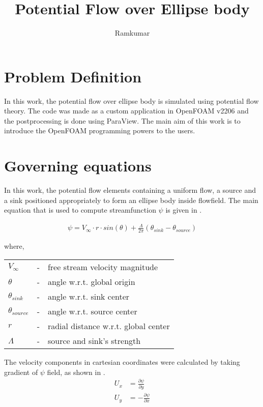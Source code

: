 \documentclass[12pt]{article}
\title{Potential Flow over Ellipse body}
\author{Ramkumar}
\begin{document}
\maketitle

\section{Problem Definition}
In this work, the potential flow over ellipse body is simulated using potential
flow theory. The code was made as a custom application in OpenFOAM v2206 and
the postprocessing is done using ParaView. The main aim of this work is to
introduce the OpenFOAM programming powers to the users.

\section{Governing equations}\label{eqnSection}
In this work, the potential flow elements containing a uniform flow, a source
and a sink positioned appropriately to form an ellipse body inside flowfield.
The main equation that is used to compute streamfunction \(\psi\) is given in
.


\begin{align}
	\psi = V_{\infty} \cdot r \cdot sin(\theta) + \frac{\Lambda}{2\pi}\left(\theta_{sink} - \theta_{source} \right)  \label{psiEqn}
\end{align}

where,

\hspace{1cm}
\begin{tabular}{lcl}
	\(\displaystyle{V_{\infty}}\) & - & free stream velocity magnitude \\
	\(\displaystyle{\theta}\) & - & angle w.r.t. global origin \\
	\(\displaystyle{\theta_{sink}}\) & - & angle w.r.t. sink center \\
	\(\displaystyle{\theta_{source}}\) & - & angle w.r.t. source center \\
	\(\displaystyle{r}\) & - & radial distance w.r.t. global center \\
	\(\displaystyle{\Lambda}\) & - & source and sink's strength \\
\end{tabular} \newline

The velocity components in cartesian coordinates were calculated by taking gradient
of \(\displaystyle{\psi}\) field, as shown in .
\begin{align}
	U_x &= \frac{\partial \psi}{\partial y} \label{UxEqn} \\
	U_y &= -\frac{\partial \psi}{\partial x} \label{UyEqn}
\end{align}\\
\end{document}
